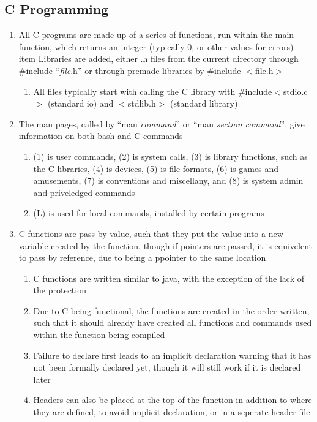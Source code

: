 \documentclass[11 pt, twoside]{article}
\begin{document}
\subsection{C Programming}
\begin{enumerate}
\item All C programs are made up of a series of functions, run within the main function, which returns an integer (typically 0, or other values for errors)
item Libraries are added, either .h files from the current directory through \#include ``\textit{file}.h'' or through premade libraries by \#include $<$file.h$>$
\begin{enumerate}
\item All files typically start with calling the C library with \#include$<$stdio.c$>$ (standard io) and $<$stdlib.h$>$ (standard library)
\end{enumerate}
\item The man pages, called by ``man \textit{command}'' or ``man \textit{section command}'', give information on both bash and C commands
\begin{enumerate}
\item (1) is user commands, (2) is system calls, (3) is library functions, such as the C libraries, (4) is devices, (5) is file formats, (6) is games and amusements, (7) is conventions and miscellany, and (8) is system admin and priveledged commands
\item (L) is used for local commands, installed by certain programs
\end{enumerate}
\item C functions are pass by value, such that they put the value into a new variable created by the function, though if pointers are passed, it is equivelent to pass by reference, due to being a ppointer to the same location
\begin{enumerate}
\item C functions are written similar to java, with the exception of the lack of the protection
\item Due to C being functional, the functions are created in the order written, such that it should already have created all functions and commands used within the function being compiled
\item Failure to declare first leads to an implicit declaration warning that it has not been formally declared yet, though it will still work if it is declared later
\item Headers can also be placed at the top of the function in addition to where they are defined, to avoid implicit declaration, or in a seperate header file
\end{enumerate}
\end{enumerate}
\end{document}
